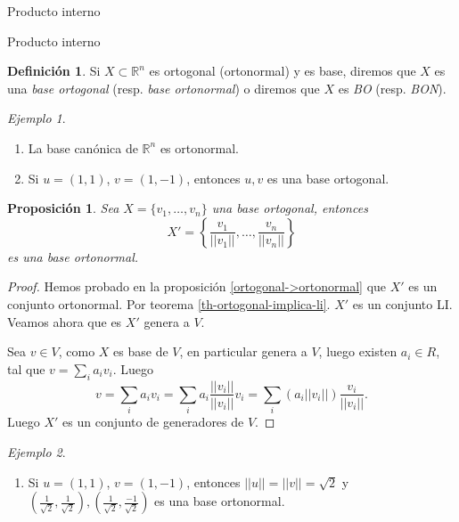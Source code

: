 \documentclass[a4paper,12pt,twoside,spanish,reqno]{amsbook}
\numberwithin{equation}{section}
\newtheorem{proposicion}[teorema]{Proposici\'on}
\theoremstyle{definition}
\newtheorem{definicion}[teorema]{Definici\'on}
\theoremstyle{remark}
\newtheorem*{ejemplo*}{Ejemplo}
\newcommand{\R}{\mathbb R}
\begin{document}
\begin{chapter}{Producto interno}
\begin{section}{Producto interno}
        \begin{definicion} Si $X \subset \R^n$ es ortogonal (ortonormal) y es base, diremos que $X$ es una \textit{base ortogonal} (resp. \textit{base ortonormal}) o diremos que $X$ es \textit{BO} (resp. \textit{BON}).
        \end{definicion}
        
        \begin{ejemplo*} ${}^{}$
            \begin{enumerate}
                \item La base canónica de $\R^n$ es ortonormal. 
                \item Si $u=(1,1)$, $v=(1,-1)$, entonces $u,v$ es una base ortogonal.  
            \end{enumerate}
        \end{ejemplo*}
        
        \begin{proposicion} Sea $ X = \{v_1,\ldots,v_n\}$ una base ortogonal, entonces 
            \begin{equation*}
                X' = \left\{\frac{v_1}{||v_1||},\ldots,\frac{v_n}{||v_n||} \right\}
            \end{equation*}
            es una base ortonormal.
        \end{proposicion}
        \begin{proof}
            Hemos probado en la proposición \ref{ortogonal->ortonormal} que $X'$ es un conjunto ortonormal.  Por  teorema \ref{th-ortogonal-implica-li}. $X'$ es un conjunto LI.   Veamos ahora que es $X'$ genera a $V$. 
            
            Sea $v \in V$, como $X$  es base de  $V$, en particular genera a $V$, luego existen $a_i \in R$, tal que  $v = \sum_i a_i v_i$. Luego
            $$
            v = \sum_i a_i v_i = \sum_i a_i \frac{||v_i||}{||v_i||} v_i = \sum_i (a_i ||v_i||) \frac{v_i}{||v_i||}.
            $$
            Luego $X'$ es un conjunto de generadores de $V$. 
        \end{proof}
        \begin{ejemplo*} 
            \begin{enumerate}
                \item Si $u=(1,1)$, $v=(1,-1)$, entonces $||u||=||v|| = \sqrt{2}$ y $(\frac{1}{\sqrt{2}},\frac{1}{\sqrt{2}}),(\frac{1}{\sqrt{2}},\frac{-1}{\sqrt{2}})$ es una base ortonormal.  
            \end{enumerate}
        \end{ejemplo*}
        

\end{section}
\end{chapter}
\end{document}
